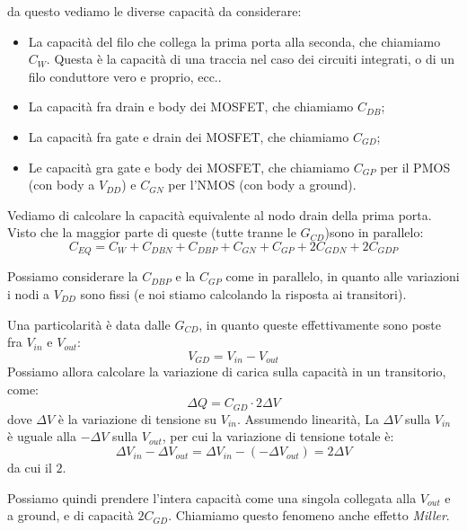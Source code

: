 \documentclass[a4paper,11pt]{article}
\begin{document}
da questo vediamo le diverse capacità da considerare:
\begin{itemize}
	\item La capacità del filo che collega la prima porta alla seconda, che chiamiamo $C_W$. Questa è la capacità di una traccia nel caso dei circuiti integrati, o di un filo conduttore vero e proprio, ecc..
	\item La capacità fra drain e body dei MOSFET, che chiamiamo $C_{DB}$;
	\item La capacità fra gate e drain dei MOSFET, che chiamiamo $C_{GD}$;
	\item Le capacità gra gate e body dei MOSFET, che chiamiamo $C_{GP}$ per il PMOS (con body a $V_{DD}$) e $C_{GN}$ per l'NMOS (con body a ground).
\end{itemize}

Vediamo di calcolare la capacità equivalente al nodo drain della prima porta. Visto che la maggior parte di queste (tutte tranne le $G_{CD}$)sono in parallelo:
$$
C_{EQ} = C_W + C_{DBN} + C_{DBP} + C_{GN} + C_{GP} + 2 C_{GDN} + 2 C_{GDP}
$$

Possiamo considerare la $C_{DBP}$ e la $C_{GP}$ come in parallelo, in quanto alle variazioni i nodi a $V_{DD}$ sono fissi (e noi stiamo calcolando la risposta ai transitori).

Una particolarità è data dalle $G_{CD}$, in quanto queste effettivamente sono poste fra $V_{in}$ e $V_{out}$:
$$
V_{GD} = V_{in} - V_{out}
$$
Possiamo allora calcolare la variazione di carica sulla capacità in un transitorio, come:
$$
\Delta Q = C_{GD} \cdot 2 \Delta V
$$
dove $\Delta V$ è la variazione di tensione su $V_{in}$. Assumendo linearità, La $\Delta V$ sulla $V_{in}$ è uguale alla $-\Delta V$ sulla $V_{out}$, per cui la variazione di tensione totale è:
$$
\Delta V_{in} - \Delta V_{out} = \Delta V_{in} - (-\Delta V_{out}) = 2 \Delta V
$$
da cui il $2$.

Possiamo quindi prendere l'intera capacità come una singola collegata alla $V_{out}$ e a ground, e di capacità $2 C_{GD}$. Chiamiamo questo fenomeno anche effetto \textit{Miller}.

\par\smallskip
\end{document}
